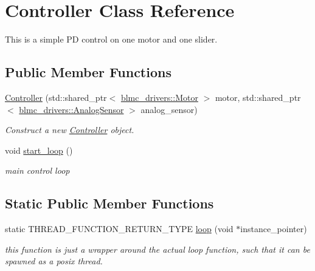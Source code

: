 \hypertarget{classController}{}\section{Controller Class Reference}
\label{classController}


This is a simple PD control on one motor and one slider.  


\subsection*{Public Member Functions}
\begin{DoxyCompactItemize}
\item 
\hyperlink{classController_aceedb7c8fbd0fab8080fd7273d9dc65d}{Controller} (std\+::shared\+\_\+ptr$<$ \hyperlink{classblmc__drivers_1_1Motor}{blmc\+\_\+drivers\+::\+Motor} $>$ motor, std\+::shared\+\_\+ptr$<$ \hyperlink{classblmc__drivers_1_1AnalogSensor}{blmc\+\_\+drivers\+::\+Analog\+Sensor} $>$ analog\+\_\+sensor)
\begin{DoxyCompactList}\small\item\em Construct a new \hyperlink{classController}{Controller} object. \end{DoxyCompactList}\item 
\mbox{\label{classController_a63abf4d0c948dca6887de01050491f8d}} 
void \hyperlink{classController_a63abf4d0c948dca6887de01050491f8d}{start\+\_\+loop} ()
\begin{DoxyCompactList}\small\item\em main control loop \end{DoxyCompactList}\end{DoxyCompactItemize}
\subsection*{Static Public Member Functions}
\begin{DoxyCompactItemize}
\item 
\mbox{\label{classController_a596a9a35dcda61307e36bb2d8c4f067e}} 
static T\+H\+R\+E\+A\+D\+\_\+\+F\+U\+N\+C\+T\+I\+O\+N\+\_\+\+R\+E\+T\+U\+R\+N\+\_\+\+T\+Y\+PE \hyperlink{classController_a596a9a35dcda61307e36bb2d8c4f067e}{loop} (void $\ast$instance\+\_\+pointer)
\begin{DoxyCompactList}\small\item\em this function is just a wrapper around the actual loop function, such that it can be spawned as a posix thread. \end{DoxyCompactList}\end{DoxyCompactItemize}
